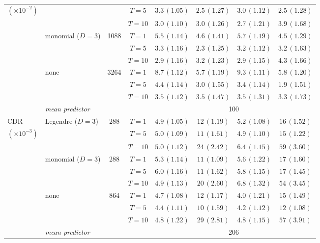 \begin{tabular}{llcccccc}
$(\times 10^{-2})$ & &  & $T=5$ & $3.3\,(1.05)$ & $2.5\,(1.27)$ & $3.0\,(1.12)$ & $2.5\,(1.28)$ \\  %
 & &  & $T=10$ & $3.0\,(1.10)$ & $3.0\,(1.26)$ & $2.7\,(1.21)$ & $3.9\,(1.68)$ \\  %
\cmidrule(lr){2-8}
 & \multirow{3}{*}{monomial ($D=3$)} & \multirow{3}{*}{1088} & $T=1$ & $5.5\,(1.14)$ & $4.6\,(1.41)$ & $5.7\,(1.19)$ & $4.5\,(1.29)$ \\  %
 & &  & $T=5$ & $3.3\,(1.16)$ & $2.3\,(1.25)$ & $3.2\,(1.12)$ & $3.2\,(1.63)$ \\  %
 & &  & $T=10$ & $2.9\,(1.16)$ & $3.2\,(1.23)$ & $2.9\,(1.15)$ & $4.3\,(1.66)$ \\  %
\cmidrule(lr){2-8}
 & \multirow{3}{*}{none} & \multirow{3}{*}{3264} & $T=1$ & $8.7\,(1.12)$ & $5.7\,(1.19)$ & $9.3\,(1.11)$ & $5.8\,(1.20)$ \\  %
 & &  & $T=5$ & $4.4\,(1.14)$ & $3.0\,(1.55)$ & $3.4\,(1.14)$ & $1.9\,(1.51)$ \\  %
 & &  & $T=10$ & $3.5\,(1.12)$ & $3.5\,(1.47)$ & $3.5\,(1.31)$ & $3.3\,(1.73)$ \\  %
\cmidrule(lr){2-8}
& \emph{mean predictor} & & & \multicolumn{4}{c}{100} \\
\midrule
\cmidrule(lr){2-8}
CDR & \multirow{3}{*}{Legendre ($D=3$)} & \multirow{3}{*}{288} & $T=1$ & $4.9\,(1.05)$ & $12\,(1.19)$ & $5.2\,(1.08)$ & $16\,(1.52)$ \\  %
$(\times 10^{-3})$ & &  & $T=5$ & $5.0\,(1.09)$ & $11\,(1.61)$ & $4.9\,(1.10)$ & $15\,(1.22)$ \\  %
 & &  & $T=10$ & $5.0\,(1.12)$ & $24\,(2.42)$ & $6.4\,(1.15)$ & $59\,(3.60)$ \\  %
\cmidrule(lr){2-8}
 & \multirow{3}{*}{monomial ($D=3$)} & \multirow{3}{*}{288} & $T=1$ & $5.3\,(1.14)$ & $11\,(1.09)$ & $5.6\,(1.22)$ & $17\,(1.60)$ \\  %
 & &  & $T=5$ & $6.0\,(1.16)$ & $11\,(1.62)$ & $5.8\,(1.15)$ & $17\,(1.45)$ \\  %
 & &  & $T=10$ & $4.9\,(1.13)$ & $20\,(2.60)$ & $6.8\,(1.32)$ & $54\,(3.45)$ \\  %
\cmidrule(lr){2-8}
 & \multirow{3}{*}{none} & \multirow{3}{*}{864} & $T=1$ & $4.7\,(1.08)$ & $12\,(1.17)$ & $4.0\,(1.21)$ & $15\,(1.49)$ \\  %
 & &  & $T=5$ & $4.4\,(1.11)$ & $10\,(1.59)$ & $4.2\,(1.12)$ & $12\,(1.08)$ \\  %
 & &  & $T=10$ & $4.8\,(1.22)$ & $29\,(2.81)$ & $4.8\,(1.15)$ & $57\,(3.91)$ \\  %
\cmidrule(lr){2-8}
& \emph{mean predictor} & & & \multicolumn{4}{c}{206} \\
\bottomrule
\end{tabular}

